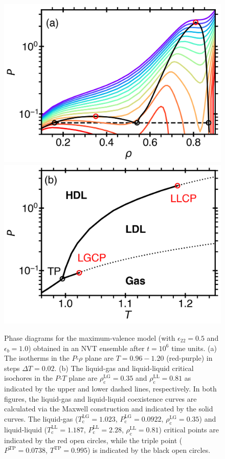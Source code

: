 \documentclass[9pt,twocolumn,twoside,lineno]{pnas-new}
\begin{document}
\begin{figure}[t]
\centering
{
\includegraphics[width=0.9\linewidth]{Fig2a_PrhoDia.png}
\includegraphics[width=0.9\linewidth]{Fig2b_PTdia.png}
}
\caption{Phase diagrams for the maximum-valence model (with $\epsilon_{22}=0.5$ and $\epsilon_b=1.0$) obtained in an NVT ensemble after $t=10^6$ time units. (a) The isotherms in the $P$-$\rho$ plane are $T=0.96-1.20$ (red-purple) in steps $\Delta T=0.02$. (b) The liquid-gas and liquid-liquid critical isochores in the $P$-$T$ plane are $\rho_\text{c}^\text{LG}=0.35$ and $\rho_\text{c}^\text{LL} = 0.81$ as indicated by the upper and lower dashed lines, respectively. In both figures, the liquid-gas and liquid-liquid coexistence curves are calculated via the Maxwell construction and indicated by the solid curves. The liquid-gas ($T_\text{c}^\text{LG}=1.023$, $P_\text{c}^\text{LG}=0.0922$, $\rho_\text{c}^\text{LG}=0.35$) and liquid-liquid ($T_\text{c}^\text{LL}=1.187$, $P_\text{c}^\text{LL}=2.28$, $\rho_\text{c}^\text{LL}=0.81$) critical points are indicated by the red open circles, while the triple point ($P^\text{TP}=0.0738$, $T^\text{TP}=0.995$) is indicated by the black open circles.}
\label{fig2}
\end{figure}
\end{document}

